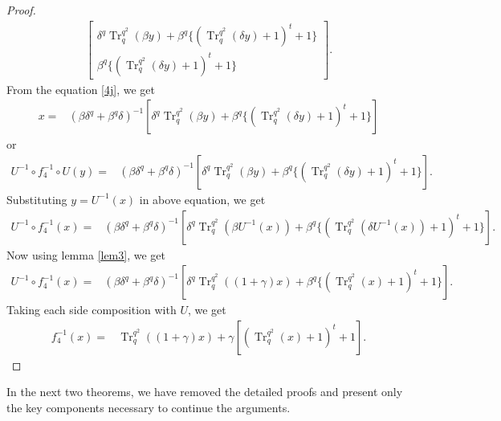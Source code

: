 \documentclass{birkjour}
\theoremstyle{definition}
\theoremstyle{remark}
\numberwithin{equation}{section}
\begin{document}
\begin{proof}
\begin{align}
\begin{bmatrix}
		\delta^{q}\operatorname{Tr}_{q}^{q^2}(\beta y)+	\beta^{q}\{(\operatorname{Tr}_q^{q^2}(\delta y)+1)^t+1\}\\
		\beta^{q}\{(\operatorname{Tr}_q^{q^2}(\delta y)+1)^t+1\}
	\end{bmatrix}.\label{4j}\end{align}
From the equation \ref{4j}, we get
\begin{align*}
	x=&(\beta\delta^{q}+\beta^{q}\delta)^{-1}[\delta^{q}\operatorname{Tr}_{q}^{q^2}(\beta y)+\beta^{q}\{(\operatorname{Tr}_q^{q^2}(\delta y)+1)^t+1\}]
\end{align*}
or
\begin{align*}
	U^{-1}\circ f_4^{-1}\circ U(y)=&(\beta\delta^{q}+\beta^{q}\delta)^{-1}[\delta^{q}\operatorname{Tr}_{q}^{q^2}(\beta y)+\beta^{q}\{(\operatorname{Tr}_q^{q^2}(\delta y)+1)^t+1\}].
	\end{align*}
Substituting $y=U^{-1}(x)$ in above equation, we get
\begin{align*}
	U^{-1}\circ f_4^{-1}(x)=&(\beta\delta^{q}+\beta^{q}\delta)^{-1}[\delta^{q}\operatorname{Tr}_{q}^{q^2}(\beta U^{-1}(x))+\beta^{q}\{(\operatorname{Tr}_q^{q^2}(\delta U^{-1}(x))+1)^t+1\}].
\end{align*}
Now using lemma \ref{lem3}, we get
\begin{align*}
	U^{-1}\circ f_4^{-1}(x)=&(\beta\delta^{q}+\beta^{q}\delta)^{-1}[\delta^{q}\operatorname{Tr}_{q}^{q^2}((1+\gamma)x)+\beta^{q}\{(\operatorname{Tr}_{q}^{q^2}(x)+1)^t+1\}].
\end{align*}
Taking each side composition with $U$, we get
\begin{align*}
	f_4^{-1}(x)=&\operatorname{Tr}_{q}^{q^2}((1+\gamma)x)+\gamma[(\operatorname{Tr}_{q}^{q^2}(x)+1)^t+1].
\end{align*}
\end{proof}

In the next two theorems, we have removed the detailed proofs and
present only the key components necessary to continue the arguments.
\end{document}
